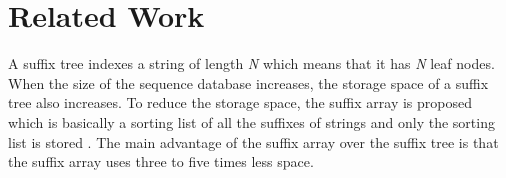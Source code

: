 \section{Related Work}
A suffix tree indexes a string of length \emph{N} which means that
it has \emph{N} leaf nodes. When the size of the sequence database
increases, the storage space of a suffix tree also increases. To
reduce the storage space, the suffix array is proposed which is
basically a sorting list of all the suffixes of strings and only the
sorting list is stored \cite{AT2009}. The main advantage of the
suffix array over the suffix tree is that the suffix array uses
three to five times less space.
